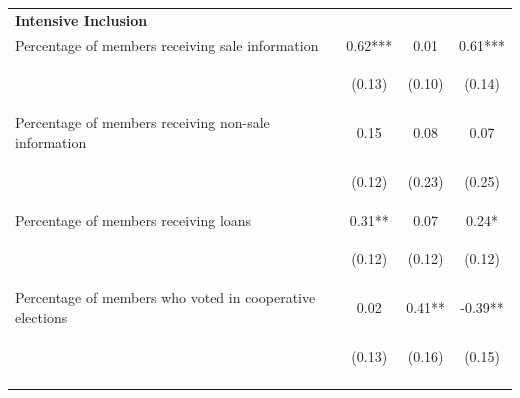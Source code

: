\documentclass[11pt]{article}
\begin{document}
\begin{table}[H]
{\begin{tabularx}{1.1\linewidth}{lccc}
 \textbf{Intensive Inclusion} & & & \\
\noalign{\smallskip}Percentage of members receiving sale information & 0.62*** & 0.01 & 0.61***\\
 & \begin{footnotesize}(0.13)\end{footnotesize} & \begin{footnotesize}(0.10)\end{footnotesize} & \begin{footnotesize}(0.14)\end{footnotesize}\\
\noalign{\smallskip}Percentage of members receiving non-sale information & 0.15 & 0.08 & 0.07\\
 & \begin{footnotesize}(0.12)\end{footnotesize} & \begin{footnotesize}(0.23)\end{footnotesize} & \begin{footnotesize}(0.25)\end{footnotesize}\\
\noalign{\smallskip}Percentage of members receiving loans & 0.31** & 0.07 & 0.24*\\
 & \begin{footnotesize}(0.12)\end{footnotesize} & \begin{footnotesize}(0.12)\end{footnotesize} & \begin{footnotesize}(0.12)\end{footnotesize}\\
\noalign{\smallskip}Percentage of members who voted in cooperative elections & 0.02 & 0.41** & -0.39**\\
 & \begin{footnotesize}(0.13)\end{footnotesize} & \begin{footnotesize}(0.16)\end{footnotesize} & \begin{footnotesize}(0.15)\end{footnotesize}\\
\noalign{\smallskip}\hline
  \end{tabularx}}
\end{table}
\doublespacing
\end{document}
